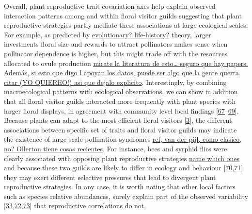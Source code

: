 \documentclass[
  12pt,
  a4paper,
]{article}
\begin{document}
Overall, plant reproductive trait covariation axes help explain observed interaction patterns among and within floral visitor guilds suggesting that plant reproductive strategies partly mediate these associations at large ecological scales. For example, as predicted by \href{}{evolutionary? life-history?} theory, larger investments floral size and rewards to attract pollinators makes sense when pollinator dependence is higher, but this might trade off with the resources allocated to ovule production \href{Anne\%20Leonard\%20tenia\%20algo\%20de\%20eso,\%20creo}{mirate la literatura de esto\ldots{} seguro que hay papers. Además, si esto que digo l apoyan los datos, puede ser algo que la gente querra citar (YO QUIEREO!) asi que dejalo explicito}. Interestingly, by combining macroecological patterns with ecological observations, we can show in addition that all floral visitor guilds interacted more frequently with plant species with larger floral displays, in agreement with community level local findings {[}\protect\hyperlink{ref-hegland2005}{67}--\protect\hyperlink{ref-kaiser2014}{69}{]}. Because plants can adapt to the most efficient floral visitors {[}\protect\hyperlink{ref-fenster2004}{3}{]}, the different associations between specific set of traits and floral visitor guilds may indicate the existence of large scale pollination syndromes \href{}{ref, van der pijl, como clasico, no? Ollerton tiene cosas recientes}. For instance, bees and syrphid flies were clearly associated with opposing plant reproductive strategies \href{}{name which ones} and because these two guilds are likely to differ in ecology and behaviour {[}\protect\hyperlink{ref-rader2020}{70},\protect\hyperlink{ref-foldesi2021}{71}{]} they may exert different selective pressures that lead to divergent plant reproductive strategies. In any case, it is worth noting that other local factors such as species relative abundances, surely explain part of the observed variability {[}\protect\hyperlink{ref-bartomeus2016}{33},\protect\hyperlink{ref-vazquez2007}{72},\protect\hyperlink{ref-encinas2012}{73}{]} that reproductive correlations do not.
\end{document}
